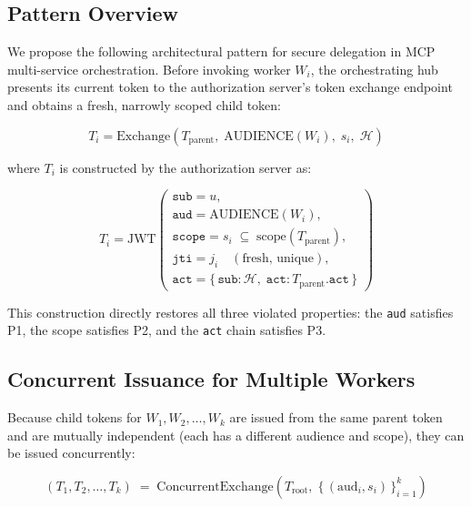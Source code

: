 \documentclass[journal]{IEEEtran}
\begin{document}
\subsection{Pattern Overview}

We propose the following architectural pattern for secure delegation in MCP
multi-service orchestration. Before invoking worker $W_i$, the orchestrating hub
presents its current token to the authorization server's token exchange endpoint
and obtains a fresh, narrowly scoped child token:

\begin{equation}
T_i = \mathrm{Exchange}\!\left(
  T_{\mathrm{parent}},\;
  \mathrm{AUDIENCE}(W_i),\;
  s_i,\;
  \mathcal{H}
\right)
\label{eq:exchange}
\end{equation}

where $T_i$ is constructed by the authorization server as:

\begin{equation}
T_i = \mathrm{JWT}\!\left(\begin{array}{l}
  \texttt{sub} = u, \\[2pt]
  \texttt{aud} = \mathrm{AUDIENCE}(W_i), \\[2pt]
  \texttt{scope} = s_i \;\subseteq\; \mathrm{scope}(T_{\mathrm{parent}}), \\[2pt]
  \texttt{jti} = j_i \quad(\text{fresh, unique}), \\[2pt]
  \texttt{act} = \{\,\texttt{sub}: \mathcal{H},\;
                    \texttt{act}: T_{\mathrm{parent}}.\texttt{act}\,\}
\end{array}\right)
\label{eq:child}
\end{equation}

This construction directly restores all three violated properties: the
\texttt{aud} satisfies P1, the scope satisfies P2, and the \texttt{act} chain
satisfies P3.

\subsection{Concurrent Issuance for Multiple Workers}

Because child tokens for $W_1, W_2, \ldots, W_k$ are issued from the same parent
token and are mutually independent (each has a different audience and scope),
they can be issued concurrently:

\begin{equation}
(T_1, T_2, \ldots, T_k)\;=\;\mathrm{ConcurrentExchange}(T_{\mathrm{root}},
\; \{\,(\mathrm{aud}_i, s_i)\,\}_{i=1}^k)
\label{eq:concurrent}
\end{equation}
\end{document}

